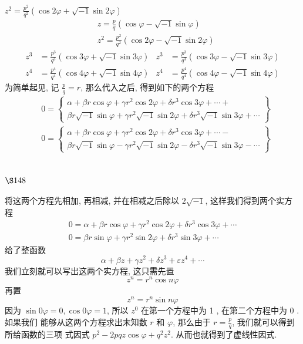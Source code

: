 $z^{2}=\frac{p^{2}}{q^{2}}(\cos 2 \varphi+\sqrt{-1} \sin 2 \varphi)$
\[
\begin{aligned}
& z=\frac{p}{q}(\cos \varphi-\sqrt{-1} \sin \varphi) \\
& z^{2}=\frac{p^{2}}{q^{2}}(\cos 2 \varphi-\sqrt{-1} \sin 2 \varphi)
\end{aligned}
\]
\[
\begin{aligned}
z^{3} & =\frac{p^{3}}{q^{3}}(\cos 3 \varphi+\sqrt{-1} \sin 3 \varphi) & z^{3} & =\frac{p^{3}}{q^{3}}(\cos 3 \varphi-\sqrt{-1} \sin 3 \varphi) \\
z^{4} & =\frac{p^{4}}{q^{4}}(\cos 4 \varphi+\sqrt{-1} \sin 4 \varphi) & z^{4} & =\frac{p^{4}}{q^{4}}(\cos 4 \varphi-\sqrt{-1} \sin 4 \varphi)
\end{aligned}
\]
为简单起见, 记 $\frac{p}{q}=r$, 那么代入之后, 得到如下的两个方程
\[
\begin{aligned}
& 0=\left\{\begin{array}{l}
\alpha+\beta r \cos \varphi+\gamma r^{2} \cos 2 \varphi+\delta r^{3} \cos 3 \varphi+\cdots+ \\
\beta r \sqrt{-1} \sin \varphi+\gamma r^{2} \sqrt{-1} \sin 2 \varphi+\delta r^{3} \sqrt{-1} \sin 3 \varphi+\cdots
\end{array}\right\} \\
& 0=\left\{\begin{array}{l}
\alpha+\beta r \cos \varphi+\gamma r^{2} \cos 2 \varphi+\delta r^{3} \cos 3 \varphi+\cdots- \\
\beta r \sqrt{-1} \sin \varphi-\gamma r^{2} \sqrt{-1} \sin 2 \varphi-\delta r^{3} \sqrt{-1} \sin 3 \varphi-\cdots
\end{array}\right\}
\end{aligned}
\]
\section{$\S 148$}

将这两个方程先相加, 再相减, 并在相减之后除以 $2 \sqrt{-1}$, 这样我们得到两个实方程
\[
\begin{gathered}
0=\alpha+\beta r \cos \varphi+\gamma r^{2} \cos 2 \varphi+\delta r^{3} \cos 3 \varphi+\cdots \\
0=\beta r \sin \varphi+\gamma r^{2} \sin 2 \varphi+\delta r^{3} \sin 3 \varphi+\cdots
\end{gathered}
\]
给了整函数
\[
\alpha+\beta z+\gamma z^{2}+\delta z^{3}+\varepsilon z^{4}+\cdots
\]
我们立刻就可以写出这两个实方程, 这只需先置
\[
z^{n}=r^{n} \cos n \varphi
\]
再置
\[
z^{n}=r^{n} \sin n \varphi
\]
因为 $\sin 0 \varphi=0, \cos 0 \varphi=1$, 所以 $z^{0}$ 在第一个方程中为 1 , 在第二个方程中为 0 . 如果我们 能够从这两个方程求出末知数 $r$ 和 $\varphi$, 那么由于 $r=\frac{p}{q}$, 我们就可以得到所给函数的三项 式因式 $p^{2}-2 p q z \cos \varphi+q^{2} z^{2}$. 从而也就得到了虚线性因式.


